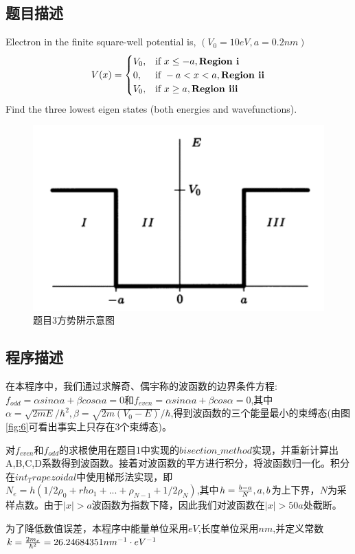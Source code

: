\documentclass[11pt]{article}
\begin{document}
  \subsection{题目描述}
  Electron in the finite square-well potential is,  $(V_0=10eV,a=0.2 nm)$
  $$
  V(x)=\begin{cases} 
    V_0, & \text{if } x \leq -a ,\textbf{Region \uppercase\expandafter{\romannumeral 1}}\\
    0, & \text{if } -a< x < a ,\textbf{Region \uppercase\expandafter{\romannumeral 2}}\\ V_0, & \text{if } x \geq a ,\textbf{Region \uppercase\expandafter{\romannumeral 3}}\\
 \end{cases}
  $$
Find the three lowest eigen states (both energies and wavefunctions).
  \begin{figure}[ht]
    \centering
    \includegraphics[width=0.6\linewidth]{photo/fig5.png}
    \caption{题目3方势阱示意图}
    \label{fig:5}
  \end{figure}
\subsection{程序描述}
在本程序中，我们通过求解奇、偶宇称的波函数的边界条件方程:$f_{odd}=\alpha sin \alpha a+\beta cos \alpha a=0$和$f_{even}=\alpha sin\alpha a+\beta cos\alpha=0$,其中$\alpha =\sqrt{2 m E}/\hbar^2,\beta=\sqrt{2 m(V_0-E)}/\hbar$,得到波函数的三个能量最小的束缚态(由图\ref{fig:6}可看出事实上只存在3个束缚态)。

对$f_{even}$和$f_{odd}$的求根使用在题目1中实现的$bisection\_method$实现，并重新计算出A,B,C,D系数得到波函数。接着对波函数的平方进行积分，将波函数归一化。积分在$int_Trapezoidal$中使用梯形法实现，即$N_e=h(1/2 \rho_0+rho_1+...+\rho_{N-1}+1/2\rho_N)$,其中$h={b-a\over N},a,b$为上下界，$N$为采样点数。由于$|x|>a$波函数为指数下降，因此我们对波函数在$|x|>50a$处截断。

为了降低数值误差，本程序中能量单位采用$eV$,长度单位采用$nm$,并定义常数$k={2 m_e\over\hbar^2}=26.24684351 nm^{-1}\cdot eV^{-1}$
\end{document}
